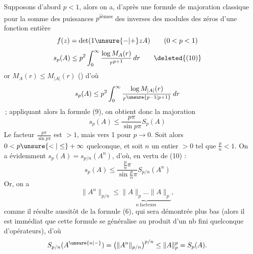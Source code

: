 Supposons d'abord $p<1$, alors on a, d'après
une formule de majoration classique pour la
somme des puissances $p$\textsuperscript{ièmes} des inverses des
modules des zéros d'une fonction entière
\[
f(z)=\det(1\unsure{-|+}zA)\qquad(0<p<1)
\]
\[
s_p(A)\leq p^2\int_0^\infty\frac{\log M_A(r)}{r^{p+1}}\,dr\tag*{\deleted{(10)}}
\]
or $M_A(r)\leq M_{|A|}(r)$ (\unsure{\ldots\ --}) d'où
\[
s_p(A)\leq p^2\int_0^\infty\frac{\log M_{|A|}(r)}{r^{\unsure{p-1|p+1}}}\,dr
\]
\,; appliquant alors la formule
(9), on obtient donc la majoration
\[
s_p(A)\leq\frac{p\pi}{\sin p\pi}S_p(A)\tag*{(10)}
\]
Le facteur $\frac{p\pi}{\sin p\pi}$ est $>1$, mais  vers 1
pour $p\to0$. Soit alors $0<p\unsure{<|\leq}+\infty$ quelconque,
et soit $n$ un entier $>0$ tel que $\frac{p}{n}<1$.
On a évidemment $s_p(A)=s_{p/n}(A^n)$, d'où, en
vertu de (10) :
\[
s_p(A)\leq\frac{\frac{p}{n}\pi}{\sin\frac{p}{n}\pi}S_{p/n}(A^n)
\]
Or, on a 
\[
\|A^n\|_{p/n}\leq\underbrace{\|A\|_p\ldots\|A\|_p}_{n\ \text{facteurs}},
\]
comme il résulte aussitôt de la formule (6), qui sera
démontrée plus bas (alors il est immédiat
que cette formule se généralise au produit d'un
nb fini quelconque d'opérateurs), d'où
\[
S_{p/n}(A^{\unsure{n|{-}}})=\left(\|A^n\|_{p/n}\right)^{p/n}
\leq\|A\|_p^p=S_p(A).
\]
